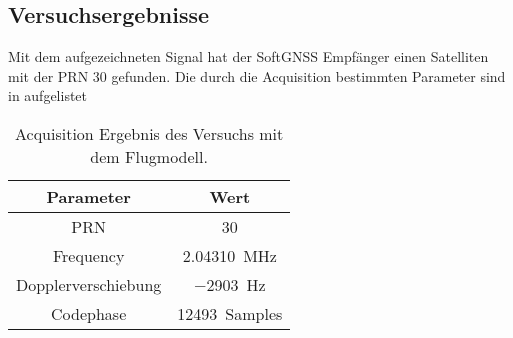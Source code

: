 \subsection{Versuchsergebnisse}
Mit dem aufgezeichneten Signal hat der SoftGNSS Empfänger einen Satelliten mit der PRN 30 gefunden. Die durch die Acquisition bestimmten Parameter sind in  aufgelistet

\begin{table}[htbp]
    \ttabbox
    {
        \caption[Acquisition Ergebnis Flugmodell]{Acquisition Ergebnis des Versuchs mit dem Flugmodell.}
        \label{FlugmodellAcquisitionErgebnisse}
    }
    {
    \begin{tabular}{c c}
        \toprule
        Parameter               & Wert \\
        \midrule
        PRN	                    & \num{30} \\
        Frequency               & \SI{2.04310}{MHz} \\
        Dopplerverschiebung     & \SI{-2903}{Hz} \\
        Codephase               & \SI{12493}{Samples} \\
        \bottomrule
    \end{tabular}
}
\end{table}

